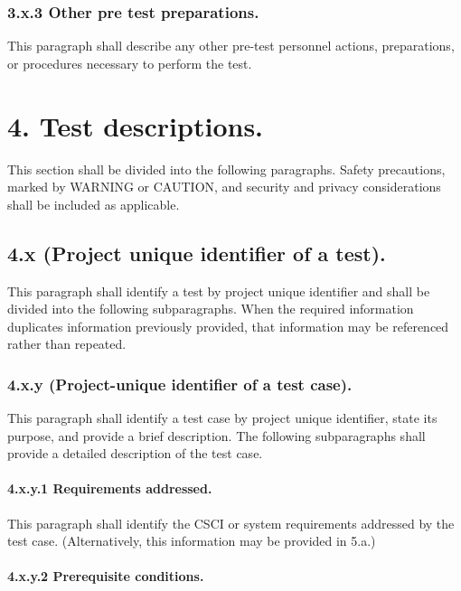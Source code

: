 \subsubsection{3.x.3 Other pre test preparations.}

This paragraph shall describe any other pre-test personnel actions,
preparations, or procedures necessary to perform the test.

\section{4. Test descriptions.}

This section shall be divided into the following paragraphs. Safety
precautions, marked by WARNING or CAUTION, and security and privacy
considerations shall be included as applicable.

\subsection{4.x (Project unique identifier of a test).}

This paragraph shall identify a test by project unique identifier and
shall be divided into the following subparagraphs. When the required
information duplicates information previously provided, that information
may be referenced rather than repeated.

\subsubsection{4.x.y (Project-unique identifier of a test case).}

This paragraph shall identify a test case by project unique identifier,
state its purpose, and provide a brief description. The following
subparagraphs shall provide a detailed description of the test case.

\paragraph{4.x.y.1 Requirements addressed.}

This paragraph shall identify the CSCI or system requirements addressed
by the test case. (Alternatively, this information may be provided in
5.a.)

\paragraph{4.x.y.2 Prerequisite conditions.}

